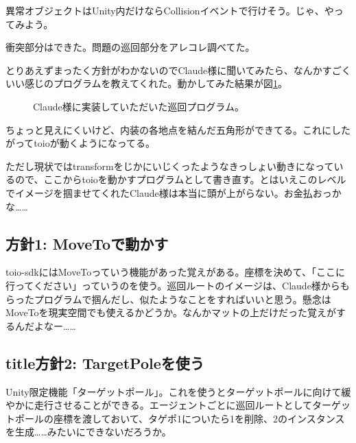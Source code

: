 \documentclass[twocolumn]{mynote}
\begin{document}
異常オブジェクトはUnity内だけならCollisionイベントで行けそう。じゃ、やってみよう。

衝突部分はできた。問題の巡回部分をアレコレ調べてた。

とりあえずまったく方針がわかないのでClaude様に聞いてみたら、なんかすごくいい感じのプログラムを教えてくれた。動かしてみた結果が図\ref{fig:patrol-draft}。

\fboxsep=0pt            %
\fboxrule=1pt            %
\begin{figure}[h]
  \centering
  \caption{Claude様に実装していただいた巡回プログラム。}
  \label{fig:patrol-draft}
\end{figure}

ちょっと見えにくいけど、内装の各地点を結んだ五角形ができてる。これにしたがってtoioが動くようになってる。

ただし現状ではtransformをじかにいじくったようなきっしょい動きになっているので、ここからtoioを動かすプログラムとして書き直す。とはいえこのレベルでイメージを掴ませてくれたClaude様は本当に頭が上がらない。お金払おっかな……

\subsection*{方針1: MoveToで動かす}
toio-sdkにはMoveToっていう機能があった覚えがある。座標を決めて、「ここに行ってください」っていうのを使う。巡回ルートのイメージは、Claude様からもらったプログラムで掴んだし、似たようなことをすればいいと思う。懸念はMoveToを現実空間でも使えるかどうか。なんかマットの上だけだった覚えがするんだよなー……

\subsection*{title方針2: TargetPoleを使う}
Unity限定機能「ターゲットポール」。これを使うとターゲットポールに向けて緩やかに走行させることができる。エージェントごとに巡回ルートとしてターゲットポールの座標を渡しておいて、タゲポ1についたら1を削除、2のインスタンスを生成……みたいにできないだろうか。
\end{document}
